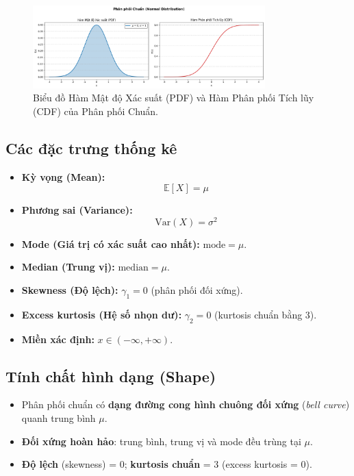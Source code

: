 \documentclass[a4paper,12pt]{article}
\begin{document}
\begin{figure}[h!]
    \centering
    \includegraphics[width=0.8\textwidth]{images/Normal_PDF_and_CDF.png}
    \caption{Biểu đồ Hàm Mật độ Xác suất (PDF) và Hàm Phân phối Tích lũy (CDF) của Phân phối Chuẩn.}
    \label{fig:normal_dist}
\end{figure}

\subsection{Các đặc trưng thống kê}
\begin{itemize}
    \item \textbf{Kỳ vọng (Mean):} 
    \[
    \mathbb{E}[X] = \mu
    \]
    \item \textbf{Phương sai (Variance):} 
    \[
    \mathrm{Var}(X) = \sigma^2
    \]
    \item \textbf{Mode (Giá trị có xác suất cao nhất):} $\mathrm{mode} = \mu$.
    \item \textbf{Median (Trung vị):} $\mathrm{median} = \mu$.
    \item \textbf{Skewness (Độ lệch):} $\gamma_1 = 0$ (phân phối đối xứng).
    \item \textbf{Excess kurtosis (Hệ số nhọn dư):} $\gamma_2 = 0$ (kurtosis chuẩn bằng 3).
    \item \textbf{Miền xác định:} $x \in (-\infty, +\infty)$.
\end{itemize}

\subsection{Tính chất hình dạng (Shape)}

\begin{itemize}
    \item Phân phối chuẩn có \textbf{dạng đường cong hình chuông đối xứng} (\textit{bell curve}) quanh trung bình $\mu$.
    \item \textbf{Đối xứng hoàn hảo}: trung bình, trung vị và mode đều trùng tại $\mu$.
    \item \textbf{Độ lệch} (skewness) = 0; \textbf{kurtosis chuẩn} = 3 (excess kurtosis = 0).
\end{itemize}
\end{document}
